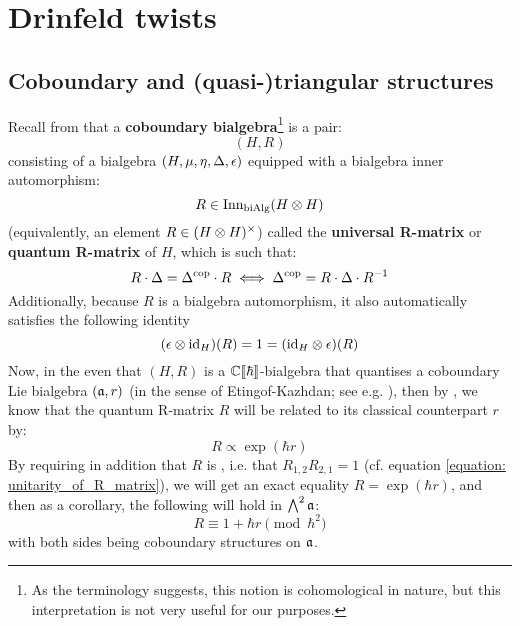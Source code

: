 \section{Drinfeld twists}
    \subsection{Coboundary and (quasi-)triangular structures}
        Recall from \cite[Subsection 9.4.1]{etingof_schiffmann_lectures_on_quantum_groups} that a \textbf{coboundary bialgebra}\footnote{As the terminology suggests, this notion is cohomological in nature, but this interpretation is not very useful for our purposes.} is a pair:
            $$(H, R)$$
        consisting of a bialgebra $(H, \mu, \eta, \Delta, \epsilon)$ equipped with a bialgebra inner automorphism:
            $$R \in \Inn_{\bi\Alg}(H \tensor H)$$
        (equivalently, an element $R \in (H \tensor H)^{\x}$) called the \textbf{universal R-matrix} or \textbf{quantum R-matrix} of $H$, which is such that:
            \begin{equation} \label{equation: R_matrix_intertwining_with_coproduct}
                R \cdot \Delta = \Delta^{\mathrm{cop}} \cdot R \iff \Delta^{\mathrm{cop}} = R \cdot \Delta \cdot R^{-1}
            \end{equation}
        Additionally, because $R$ is a bialgebra automorphism, it also automatically satisfies the following identity
            \begin{equation} \label{equation: R_matrix_intertwining_with_counit}
                (\e \tensor \id_H)(R) = 1 = (\id_H \tensor \e)(R)
            \end{equation}
        Now, in the even that $(H, R)$ is a $\mathbb{C}[\![\hbar]\!]$-bialgebra that quantises a coboundary Lie bialgebra $(\mathfrak{a}, r)$ (in the sense of Etingof-Kazhdan; see e.g. \cite{etingof_kazhdan_quantisation_1}), then by \cite[Proposition 9.2]{etingof_schiffmann_lectures_on_quantum_groups}, we know that the quantum R-matrix $R$ will be related to its classical counterpart $r$ by:
            $$R \propto \exp( \hbar r )$$
        By requiring in addition that $R$ is , i.e. that $R_{1, 2} R_{2, 1} = 1$ (cf. equation \eqref{equation: unitarity_of_R_matrix}), we will get an exact equality $R = \exp(\hbar r)$, and then as a corollary, the following will hold in $\bigwedge^2 \mathfrak{a}$:
            $$R \equiv 1 + \hbar r \pmod{\hbar^2}$$
        with both sides being coboundary structures on $\mathfrak{a}$.

